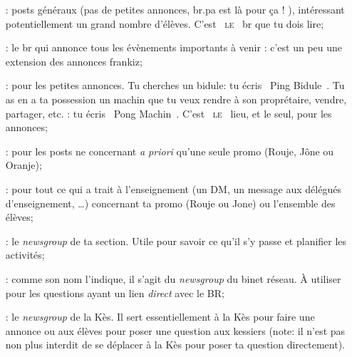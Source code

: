 \begin{itemize}
\item[\ngname{br.eleves} :] posts g\'en\'eraux (pas de petites annonces, br.pa est l\`a  pour \c ca ! ), int\'eressant potentiellement un grand nombre d'\'el\`eves. C'est \guillemotleft{}~\textsc{le}~\guillemotright{} br que tu dois lire;

\item[\ngname{br.eleves.evenements} :] le br qui annonce tous les \'ev\`enements importants \`a  venir : c'est un peu une extension des annonces frankiz;
	 
\item[\ngname{br.pa} :] pour les petites annonces. Tu cherches un bidule: tu \'ecris \guillemotleft{}~Ping Bidule~\guillemotright{}. Tu as en a ta possession un machin que tu veux rendre \`a  son propr\'etaire, vendre, partager, etc. : tu \'ecris \guillemotleft{}~Pong Machin~\guillemotright{}. C'est \guillemotleft{}~\textsc{le}~\guillemotright{} lieu, et le seul, pour les annonces;





\item[\ngname{br.promo.ta\_promo} :] pour les posts ne concernant \emph{a priori} qu'une seule promo (Rouje, J\^one ou Oranje);
	 
\item[\ngname{br.enseignement.*} :] pour tout ce qui a trait \`a  l'enseignement (un DM, un message aux d\'el\'egu\'es d'enseignement, \dots) concernant ta promo (Rouje ou Jone) ou l'ensemble des \'el\`eves;
 
\item[\ngname{br.section.ta\_section\_sportive} :] le \emph{newsgroup} de ta section. Utile pour savoir ce qu'il s'y passe et planifier les activit\'es;

\item[\ngname{br.binet.br} :] comme son nom l'indique, il s'agit du \emph{newsgroup} du binet r\'eseau. \`A utiliser pour les questions ayant un lien \emph{direct} avec le BR;

\item[\ngname{br.kes} :] le \emph{newsgroup} de la K\`es. Il sert essentiellement \`a  la K\`es pour faire une annonce ou aux \'el\`eves pour poser une question aux kessiers (note: il n'est pas non plus interdit de se d\'eplacer \`a  la K\`es pour poser ta question directement).

\end{itemize}



